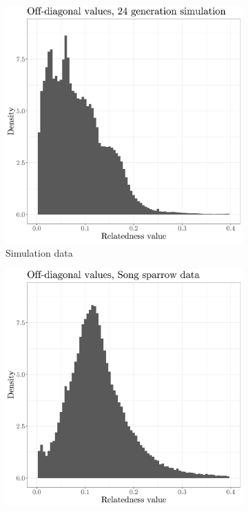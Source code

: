 \begin{figure}
  \centering
  \begin{subfigure}[b]{0.5\textwidth}
    \centering
    \includegraphics[width=\textwidth]{figures/relatedness-offdiagonal-sim.pdf}
    \caption{Simulation data}
    \label{fig:relatedness:simulation}
  \end{subfigure}%
  \begin{subfigure}[b]{0.5\textwidth}
    \centering
    \includegraphics[width=\textwidth]{figures/relatedness-offdiagonal-songsparrow.pdf}

\end{subfigure}
\end{figure}
